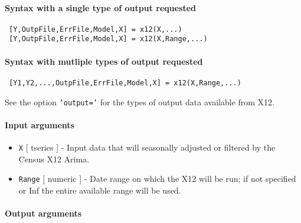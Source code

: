 


	\paragraph{Syntax with a single type of output requested}
 
 \begin{verbatim}
 [Y,OutpFile,ErrFile,Model,X] = x12(X,...)
 [Y,OutpFile,ErrFile,Model,X] = x12(X,Range,...)
 \end{verbatim}
 
 \paragraph{Syntax with mutliple types of output requested}
 
 \begin{verbatim}
 [Y1,Y2,...,OutpFile,ErrFile,Model,X] = x12(X,Range,...)
 \end{verbatim}
 
 See the option \texttt{'output='} for the types of output data available
 from X12.
 
 \paragraph{Input arguments}
 
 \begin{itemize}
 \item
   \texttt{X} {[} tseries {]} - Input data that will seasonally adjusted
   or filtered by the Census X12 Arima.
 \item
   \texttt{Range} {[} numeric {]} - Date range on which the X12 will be
   run; if not specified or Inf the entire available range will be used.
 \end{itemize}
 
 \paragraph{Output arguments}
 
